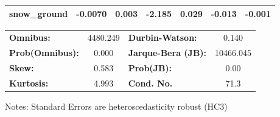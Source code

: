 \begin{center}
\begin{tabular}{lcccccc}
\textbf{snow\_ground} &      -0.0070  &        0.003     &    -2.185  &         0.029        &       -0.013    &       -0.001     \\
\bottomrule
\end{tabular}
\begin{tabular}{lclc}
\textbf{Omnibus:}       & 4480.249 & \textbf{  Durbin-Watson:     } &     0.140  \\
\textbf{Prob(Omnibus):} &   0.000  & \textbf{  Jarque-Bera (JB):  } & 10466.045  \\
\textbf{Skew:}          &   0.583  & \textbf{  Prob(JB):          } &      0.00  \\
\textbf{Kurtosis:}      &   4.993  & \textbf{  Cond. No.          } &      71.3  \\
\bottomrule
\end{tabular}
\end{center}

Notes: \newline
 [1] Standard Errors are heteroscedasticity robust (HC3)
